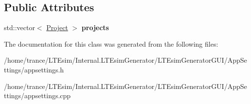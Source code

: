 \subsection*{Public Attributes}
\begin{DoxyCompactItemize}
\item 
std\+::vector$<$ \hyperlink{struct_project}{Project} $>$ {\bfseries projects}\hypertarget{class_app_settings_a750057357b7231682c87636e0e1c355f}{}\label{class_app_settings_a750057357b7231682c87636e0e1c355f}

\end{DoxyCompactItemize}


The documentation for this class was generated from the following files\+:\begin{DoxyCompactItemize}
\item 
/home/trance/\+L\+T\+Esim/\+Internal.\+L\+T\+Esim\+Generator/\+L\+T\+Esim\+Generator\+G\+U\+I/\+App\+Settings/appsettings.\+h\item 
/home/trance/\+L\+T\+Esim/\+Internal.\+L\+T\+Esim\+Generator/\+L\+T\+Esim\+Generator\+G\+U\+I/\+App\+Settings/appsettings.\+cpp\end{DoxyCompactItemize}
